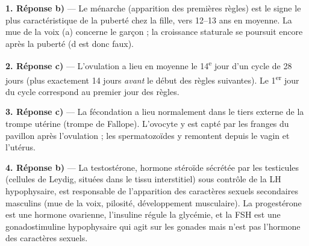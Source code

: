 \documentclass[11pt]{article}
\newcommand{\cle}[1]{{\popxbold\color{popdark}#1}}
\begin{document}
\begin{corrige}
\textbf{1. Réponse b)} — Le \cle{ménarche} (apparition des premières règles) est le signe le plus caractéristique de la puberté chez la fille, vers 12--13 ans en moyenne. La mue de la voix (a) concerne le garçon ; la croissance staturale se poursuit encore après la puberté (d est donc faux).

\textbf{2. Réponse c)} — L'ovulation a lieu en moyenne le 14\textsuperscript{e} jour d'un cycle de 28 jours (plus exactement 14 jours \emph{avant} le début des règles suivantes). Le 1\textsuperscript{er} jour du cycle correspond au premier jour des règles.

\textbf{3. Réponse c)} — La fécondation a lieu normalement dans le tiers externe de la \cle{trompe utérine} (trompe de Fallope). L'ovocyte y est capté par les franges du pavillon après l'ovulation ; les spermatozoïdes y remontent depuis le vagin et l'utérus.

\textbf{4. Réponse b)} — La \cle{testostérone}, hormone stéroïde sécrétée par les testicules (cellules de Leydig, situées dans le tissu interstitiel) sous contrôle de la LH hypophysaire, est responsable de l'apparition des caractères sexuels secondaires masculins (mue de la voix, pilosité, développement musculaire). La progestérone est une hormone ovarienne, l'insuline régule la glycémie, et la FSH est une gonadostimuline hypophysaire qui agit sur les gonades mais n'est pas l'hormone des caractères sexuels.
\end{corrige}
\end{document}
